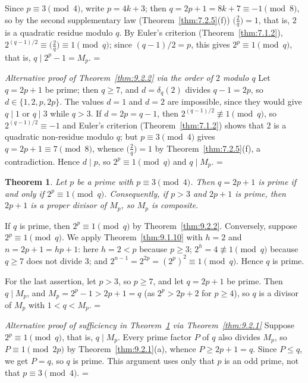 \documentclass[11pt]{article}
\makeatletter
\theoremstyle{ntstyle}
\newtheorem{theorem}{Theorem}[subsection]
\let\nt@closedisplay\]
\def\nt@guardedclose{\@ifnextchar\par{\nt@closeafterpar}{\@ifnextchar\end{\postdisplaypenalty\@M\nt@closedisplay}{\nt@closedisplay}}}
\def\nt@closeafterpar\par{\@ifnextchar\par{\nt@closeafterpar}{\@ifnextchar\end{\postdisplaypenalty\@M\nt@closedisplay\par}{\nt@closedisplay\par}}}
\renewenvironment{proof}[1][\proofname]{\par
  \pushQED{\qed}\normalfont\topsep\medskipamount\edef\nt@afterproof{\@endparpenalty=\the\@endparpenalty\relax}\@beginparpenalty\@M\@endparpenalty\@M\let\]\nt@guardedclose\trivlist\item[]\textit{#1\@addpunct{.}} \ignorespaces}{\ifvmode\addpenalty\@M\fi\popQED\nt@afterproof\endtrivlist\@endpefalse}
\newenvironment{altproof}[1][\proofname]{\begin{proof}[#1]}{\end{proof}}
\newcommand{\legs}[2]{\bigl(\tfrac{#1}{#2}\bigr)}
\makeatother
\begin{document}
\begin{proof} Since $p \equiv 3 \pmod{4}$, write $p = 4k +
		3$; then $q = 2p + 1 = 8k + 7 \equiv -1 \pmod{8}$, so by the second
	supplementary law (Theorem~\ref{thm:7.2.5}(f)) $\legs{2}{q} = 1$, that is, $2$ is a
	quadratic residue modulo $q$. By Euler's criterion (Theorem~\ref{thm:7.1.2}),
	$2^{(q-1)/2} \equiv \legs{2}{q} \equiv 1 \pmod{q}$; since
	$(q-1)/2 = p$, this gives $2^{p} \equiv 1 \pmod{q}$, that is, $q \mid
		2^{p} - 1 = M_p$.
\end{proof}
\begin{altproof}[Alternative proof of Theorem~\ref{thm:9.2.2} via the order of $2$ modulo $q$]
	Let $q=2p+1$ be prime; then $q\ge7$, and $d=\delta_q(2)$ divides
	$q-1=2p$, so $d\in\{1,2,p,2p\}$. The values $d=1$ and $d=2$ are
	impossible, since they would give $q\mid1$ or $q\mid3$ while $q>3$. If
	$d=2p=q-1$, then $2^{(q-1)/2}\not\equiv1\pmod{q}$, so
	$2^{(q-1)/2}\equiv-1$ and Euler's criterion (Theorem~\ref{thm:7.1.2}) shows that $2$ is
	a quadratic non-residue modulo $q$; but $p\equiv3\pmod{4}$ gives
	$q=2p+1\equiv7\pmod{8}$, whence $\legs{2}{q}=1$ by Theorem~\ref{thm:7.2.5}(f),
	a contradiction. Hence $d\mid p$, so $2^{p}\equiv1\pmod{q}$
	and $q\mid M_p$.
\end{altproof}
\begin{theorem}\label{thm:9.2.3} Let $p$ be a prime with
	$p\equiv3\pmod{4}$. Then $q=2p+1$ is prime if and only if
	$2^{p}\equiv1\pmod{q}$. Consequently, if $p>3$ and $2p+1$ is prime, then
	$2p+1$ is a proper divisor of $M_p$, so $M_p$ is composite.
\end{theorem}

\begin{proof} If $q$ is prime, then $2^{p}\equiv1\pmod{q}$ by
	Theorem~\ref{thm:9.2.2}. Conversely, suppose $2^{p}\equiv1\pmod{q}$. We
	apply Theorem~\ref{thm:9.1.10} with $h=2$ and $n=2p+1=hp+1$: here
	$h=2<p$ because $p\ge3$; $2^{h}=4\not\equiv1\pmod{q}$ because $q\ge7$ does
	not divide $3$; and $2^{n-1}=2^{2p}=(2^{p})^{2}\equiv1\pmod{q}$. Hence $q$
	is prime.

	For the last assertion, let $p>3$, so $p\ge7$, and let $q=2p+1$ be prime.
	Then $q\mid M_p$, and $M_p=2^{p}-1>2p+1=q$ (as $2^{p}>2p+2$ for $p\ge4$),
	so $q$ is a divisor of $M_p$ with $1<q<M_p$.
\end{proof}
\begin{altproof}[Alternative proof of sufficiency in Theorem~\ref{thm:9.2.3} via Theorem~\ref{thm:9.2.1}]
	Suppose $2^{p}\equiv1\pmod{q}$, that is, $q\mid M_p$. Every prime factor
	$P$ of $q$ also divides $M_p$, so $P\equiv1\pmod{2p}$ by
	Theorem~\ref{thm:9.2.1}(a), whence $P\ge2p+1=q$. Since $P\le q$, we get
	$P=q$, so $q$ is prime. This argument uses only that $p$ is an odd
	prime, not that $p\equiv3\pmod{4}$.
\end{altproof}
\end{document}
